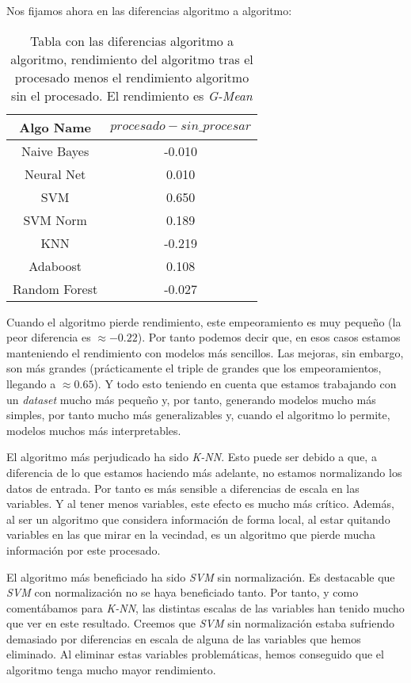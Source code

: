 \documentclass[11pt]{article}
\begin{document}
Nos fijamos ahora en las diferencias algoritmo a algoritmo:

\begin{table}[H]
\begin{center}
    \begin{tabular}{|c|c|}
        \hline
        Algo Name & $procesado - sin\_procesar$ \\
        \hline
        Naive Bayes& -0.010 \\
        Neural Net& 0.010 \\
        SVM& 0.650 \\
        SVM Norm& 0.189 \\
        KNN& -0.219 \\
        Adaboost& 0.108 \\
        Random Forest& -0.027 \\
        \hline
    \end{tabular}
\end{center}
    \caption{Tabla con las diferencias algoritmo a algoritmo, rendimiento del algoritmo tras el procesado menos el rendimiento algoritmo sin el procesado. El rendimiento es \emph{G-Mean}}
\end{table}

Cuando el algoritmo pierde rendimiento, este empeoramiento es muy pequeño (la peor diferencia es $\approx -0.22$). Por tanto podemos decir que, en esos casos estamos manteniendo el rendimiento con modelos más sencillos. Las mejoras, sin embargo, son más grandes (prácticamente el triple de grandes que los empeoramientos, llegando a $\approx 0.65$). Y todo esto teniendo en cuenta que estamos trabajando con un \emph{dataset} mucho más pequeño y, por tanto, generando modelos mucho más simples, por tanto mucho más generalizables y, cuando el algoritmo lo permite, modelos muchos más interpretables.

El algoritmo más perjudicado ha sido \emph{K-NN}. Esto puede ser debido a que, a diferencia de lo que estamos haciendo más adelante, no estamos normalizando los datos de entrada. Por tanto es más sensible a diferencias de escala en las variables. Y al tener menos variables, este efecto es mucho más crítico. Además, al ser un algoritmo que considera información de forma local, al estar quitando variables en las que mirar en la vecindad, es un algoritmo que pierde mucha información por este procesado.

El algoritmo más beneficiado ha sido \emph{SVM} sin normalización. Es destacable que \emph{SVM} con normalización no se haya beneficiado tanto. Por tanto, y como comentábamos para \emph{K-NN}, las distintas escalas de las variables han tenido mucho que ver en este resultado. Creemos que \emph{SVM} sin normalización estaba sufriendo demasiado por diferencias en escala de alguna de las variables que hemos eliminado. Al eliminar estas variables problemáticas, hemos conseguido que el algoritmo tenga mucho mayor rendimiento.
\end{document}
